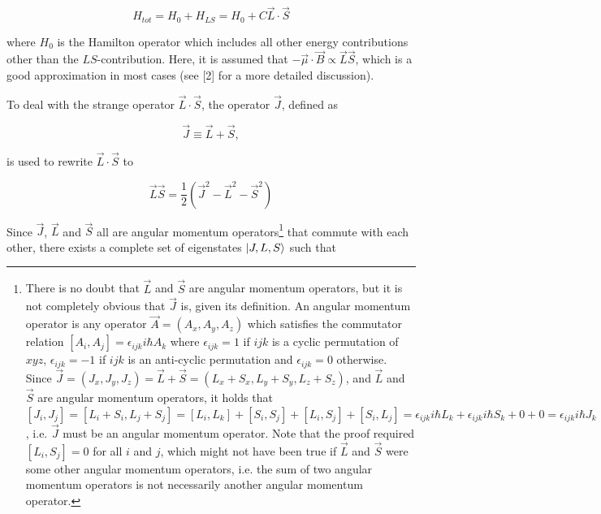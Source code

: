 \documentclass[a4paper]{article}
\begin{document}
\begin{equation}

H_{tot} = H_0 + H_{LS} = H_0 + C \vec{L}\cdot\vec{S}

\end{equation}

where $H_0$ is the Hamilton operator which includes all other energy contributions other than the $LS$-contribution. Here, it is assumed that $-\vec{\mu}\cdot\vec{B}\propto\vec{L}\vec{S}$, which is a good approximation in most cases (see [2] for a more detailed discussion).

To deal with the strange operator $\vec{L}\cdot\vec{S}$, the operator $\vec{J}$, defined as

\begin{equation}

\vec{J} \equiv \vec{L} + \vec{S},

\end{equation}

is used to rewrite $\vec{L}\cdot\vec{S}$ to

\begin{equation}

\vec{L}\vec{S}=\frac{1}{2}(\vec{J}^2-\vec{L}^2-\vec{S}^2)

\end{equation}

Since $\vec{J}$, $\vec{L}$ and $\vec{S}$ all are angular momentum operators\footnote{There is no doubt that $\vec{L}$ and $\vec{S}$ are angular momentum operators, but it is not completely obvious that $\vec{J}$ is, given its definition. An angular momentum operator is any operator $\vec{A}=(A_x,A_y,A_z)$ which satisfies the commutator relation $[A_i,A_j]= \epsilon_{ijk} i \hbar A_k$ where $\epsilon_{ijk}=1$ if $ijk$ is a cyclic permutation of $xyz$, $\epsilon_{ijk}=-1$ if $ijk$ is an anti-cyclic permutation and $\epsilon_{ijk}=0$ otherwise. Since $\vec{J} =(J_x,J_y,J_z)=\vec{L} + \vec{S} = (L_x+S_x,L_y+S_y,L_z+S_z)$, and $\vec{L}$ and $\vec{S}$ are angular momentum operators, it holds that $[J_i,J_j]=[L_i+S_i,L_j+S_j]=[L_i,L_k] + [S_i,S_j] + [L_i,S_j] + [S_i,L_j] = \epsilon_{ijk} i \hbar L_k + \epsilon_{ijk} i \hbar S_k + 0 + 0 = \epsilon_{ijk} i \hbar J_k$, i.e. $\vec{J}$ must be an angular momentum operator. Note that the proof required $[L_i,S_j]=0$ for all $i$ and $j$, which might not have been true if $\vec{L}$ and $\vec{S}$ were some other angular momentum operators, i.e. the sum of two angular momentum operators is not necessarily another angular momentum operator.} that commute with each other, there exists a complete set of eigenstates $\Ket{J,L,S}$ such that
\end{document}
